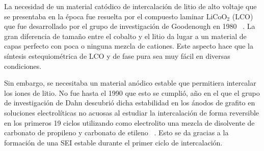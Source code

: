 La necesidad de un material catódico de intercalación de litio de alto voltaje 
que se presentaba en la época fue resuelta por el compuesto laminar LiCoO$_2$ 
(LCO) que fue desarrollado por el grupo de investigación de Goodenough en 1980
~\cite{mizushima1980}. La gran diferencia de tamaño entre el cobalto y el litio 
da lugar a un material de capas perfecto con poca o ninguna mezcla de cationes. 
Este aspecto hace que la síntesis estequiométrica de LCO y de fase pura sea muy 
fácil en diversas condiciones. 

Sin embargo, se necesitaba un material anódico estable que permitiera intercalar
los iones de litio. No fue hasta el 1990 que esto se cumplió, año en el que el
grupo de investigación de Dahn descubrió dicha estabilidad en los ánodos de 
grafito en soluciones electrolíticas no acuosas al estudiar la intercalación de 
forma reversible en los primeros 19 ciclos utilizando como electrolito una mezcla 
de disolvente de carbonato de propileno y carbonato de etileno ~\cite{fong1990}. 
Esto se da gracias a la formación de una SEI estable durante el primer ciclo de 
intercalación. 

